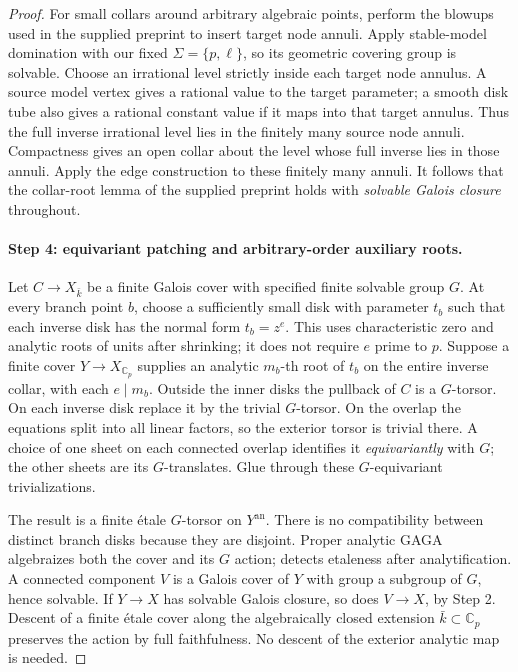 \begin{proof}
For small collars around arbitrary algebraic points, perform the
blowups used in the supplied preprint to insert target node annuli.
Apply stable-model domination with our fixed $\Sigma=\{p,\ell\}$,
so its geometric covering group is solvable.  Choose an irrational
level strictly inside each target node annulus.  A source model
vertex gives a rational value to the target parameter; a smooth
disk tube also gives a rational constant value if it maps into that
target annulus.  Thus the full inverse irrational level lies in the
finitely many source node annuli.  Compactness gives an open collar
about the level whose full inverse lies in those annuli.  Apply the
edge construction to these finitely many annuli.  It follows that
the collar-root lemma of the supplied preprint holds with
\emph{solvable Galois closure} throughout.

\paragraph{Step 4: equivariant patching and arbitrary-order auxiliary roots.}

Let $C\to X_{\bar k}$ be a finite Galois cover with specified finite
solvable group $G$.  At every branch point $b$, choose a sufficiently
small disk with parameter $t_b$ such that each inverse disk has the
normal form $t_b=z^{e}$.  This uses characteristic zero and analytic
roots of units after shrinking; it does not require $e$ prime to $p$.
Suppose a finite cover $Y\to X_{\mathbb C_p}$ supplies an analytic
$m_b$-th root of $t_b$ on the entire inverse collar, with each
$e\mid m_b$.  Outside the inner disks the pullback of $C$ is a
$G$-torsor.  On each inverse disk replace it by the trivial
$G$-torsor.  On the overlap the equations split into all linear
factors, so the exterior torsor is trivial there.  A choice of one
sheet on each connected overlap identifies it \emph{equivariantly}
with $G$; the other sheets are its $G$-translates.  Glue through
these $G$-equivariant trivializations.

The result is a finite \'etale $G$-torsor on $Y^{\mathrm{an}}$.
There is no compatibility between distinct branch disks because
they are disjoint.  Proper analytic GAGA \cite[Theorem A.1(ii)]{DE_Poineau2010} algebraizes both the
cover and its $G$ action; \cite[Fact 5.1.5]{DE_Temkin2010} detects etaleness after analytification.  A connected component $V$ is a Galois
cover of $Y$ with group a subgroup of $G$, hence solvable.  If
$Y\to X$ has solvable Galois closure, so does $V\to X$, by
Step 2.  Descent of a finite \'etale cover along the algebraically
closed extension $\bar k\subset\mathbb C_p$ preserves the action
by full faithfulness.  No descent of the exterior analytic map is
needed.


\end{proof}

